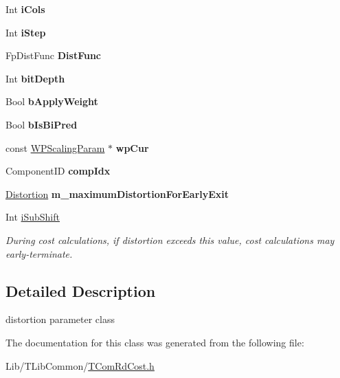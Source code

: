 \begin{DoxyCompactItemize}
\item 
\mbox{\label{class_dist_param_a9d372127b6ae9c260ff0a1320732eb2f}} 
Int {\bfseries i\+Cols}
\item 
\mbox{\label{class_dist_param_a2589c0f4852def35e54c2e2fdb45981c}} 
Int {\bfseries i\+Step}
\item 
\mbox{\label{class_dist_param_ad9217506bbc0efce35992e21ec27b9fd}} 
Fp\+Dist\+Func {\bfseries Dist\+Func}
\item 
\mbox{\label{class_dist_param_a435119776ba8790a484bd1ff990e6b7a}} 
Int {\bfseries bit\+Depth}
\item 
\mbox{\label{class_dist_param_a1291154be19384395f2dc7238f215d6e}} 
Bool {\bfseries b\+Apply\+Weight}
\item 
\mbox{\label{class_dist_param_af416e6a0e2c35aa05ec8d2406ffeb48b}} 
Bool {\bfseries b\+Is\+Bi\+Pred}
\item 
\mbox{\label{class_dist_param_a250fe2131cc7706e28c16af1d7985fe6}} 
const \hyperlink{struct_w_p_scaling_param}{W\+P\+Scaling\+Param} $\ast$ {\bfseries wp\+Cur}
\item 
\mbox{\label{class_dist_param_acc58d5e29df32b0c7910966189a58eac}} 
Component\+ID {\bfseries comp\+Idx}
\item 
\mbox{\label{class_dist_param_ad38cf08a103b178e19c698326498904d}} 
\hyperlink{_type_def_8h_aed82b23ef6849d0bc3d95c92102d5b50}{Distortion} {\bfseries m\+\_\+maximum\+Distortion\+For\+Early\+Exit}
\item 
\mbox{\label{class_dist_param_a7a06ed325f601121ef3629d23b27f538}} 
Int \hyperlink{class_dist_param_a7a06ed325f601121ef3629d23b27f538}{i\+Sub\+Shift}
\begin{DoxyCompactList}\small\item\em During cost calculations, if distortion exceeds this value, cost calculations may early-\/terminate. \end{DoxyCompactList}\end{DoxyCompactItemize}


\subsection{Detailed Description}
distortion parameter class 

The documentation for this class was generated from the following file\+:\begin{DoxyCompactItemize}
\item 
Lib/\+T\+Lib\+Common/\hyperlink{_t_com_rd_cost_8h}{T\+Com\+Rd\+Cost.\+h}\end{DoxyCompactItemize}
